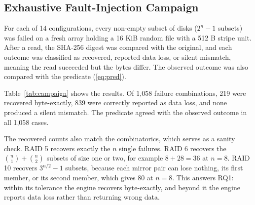 \documentclass{ieeeaccess}
\begin{document}
\subsection{Exhaustive Fault-Injection Campaign}
For each of 14 configurations, every non-empty subset of disks ($2^n - 1$ subsets) was failed on a fresh array holding a 16 KiB random file with a 512 B stripe unit. After a read, the SHA-256 digest was compared with the original, and each outcome was classified as recovered, reported data loss, or silent mismatch, meaning the read succeeded but the bytes differ. The observed outcome was also compared with the predicate (\ref{eq:pred}).

Table~\ref{tab:campaign} shows the results. Of 1,058 failure combinations, 219 were recovered byte-exactly, 839 were correctly reported as data loss, and none produced a silent mismatch. The predicate agreed with the observed outcome in all 1,058 cases.

The recovered counts also match the combinatorics, which serves as a sanity check. RAID 5 recovers exactly the $n$ single failures. RAID 6 recovers the $\binom{n}{1} + \binom{n}{2}$ subsets of size one or two, for example $8 + 28 = 36$ at $n=8$. RAID 10 recovers $3^{n/2} - 1$ subsets, because each mirror pair can lose nothing, its first member, or its second member, which gives 80 at $n = 8$. This answers RQ1: within its tolerance the engine recovers byte-exactly, and beyond it the engine reports data loss rather than returning wrong data.
\end{document}
